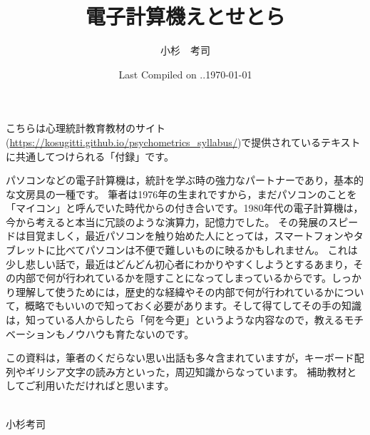\documentclass[dvipsnames]{ltjsbook}
\begin{document}

\VerbatimFootnotes
\title{電子計算機えとせとら}
\author{小杉　考司}
\date{Last Compiled on \number\year .\number\month .\number\day}
\maketitle
\setcounter{tocdepth}{1}

こちらは心理統計教育教材のサイト(\url{https://kosugitti.github.io/psychometrics_syllabus/})で提供されているテキストに共通してつけられる「付録」です。

パソコンなどの電子計算機は，統計を学ぶ時の強力なパートナーであり，基本的な文房具の一種です。
筆者は1976年の生まれですから，まだパソコンのことを「マイコン」と呼んでいた時代からの付き合いです。1980年代の電子計算機は，今から考えると本当に冗談のような演算力，記憶力でした。
その発展のスピードは目覚ましく，最近パソコンを触り始めた人にとっては，スマートフォンやタブレットに比べてパソコンは不便で難しいものに映るかもしれません。
これは少し悲しい話で，最近はどんどん初心者にわかりやすくしようとするあまり，その内部で何が行われているかを隠すことになってしまっているからです。しっかり理解して使うためには，歴史的な経緯やその内部で何が行われているかについて，概略でもいいので知っておく必要があります。そして得てしてその手の知識は，知っている人からしたら「何を今更」というような内容なので，教えるモチベーションもノウハウも育たないのです。

この資料は，筆者のくだらない思い出話も多々含まれていますが，キーボード配列やギリシア文字の読み方といった，周辺知識からなっています。
補助教材としてご利用いただければと思います。

\begin{flushright}
	\date{\today}\\
	小杉考司
\end{flushright}


\tableofcontents







\printbibliography[title=引用文献]

\printindex
\end{document}
